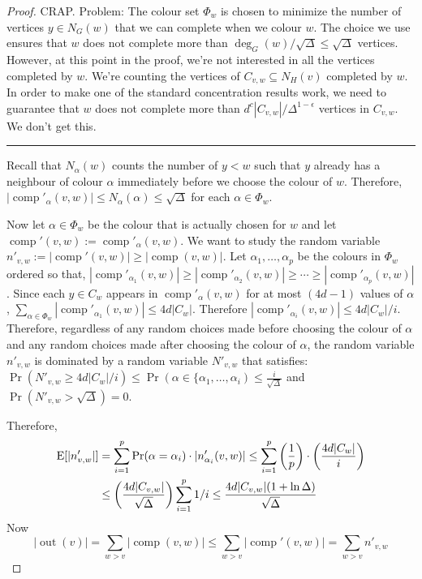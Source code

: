 \documentclass[kpfonts]{patmorin}
\DeclareMathOperator{\outn}{out}
\DeclareMathOperator{\comp}{comp}
\begin{document}
\begin{proof}
  CRAP.  Problem: The colour set $\Phi_w$ is chosen to minimize the number of vertices $y\in N_G(w)$ that we can complete when we colour $w$.   The choice we use ensures that $w$ does not complete more than $\deg_G(w)/\sqrt{\Delta}\le \sqrt{\Delta}$ vertices.  However, at this point in the proof, we're not interested in all the vertices completed by $w$.  We're counting the vertices of $C_{v,w}\subseteq N_H(v)$ completed by $w$.  In order to make one of the standard concentration results work, we need to guarantee that $w$ does not complete more than $d^c|C_{v,w}|/\Delta^{1-\epsilon}$ vertices in $C_{v,w}$.  We don't get this.

  \hrule






  Recall that $N_\alpha(w)$ counts the number of $y < w$ such that $y$ already has a neighbour of colour $\alpha$ immediately before we choose the colour of $w$.  Therefore,  $|\comp'_\alpha(v,w)|\le N_\alpha(\alpha)\le \sqrt{\Delta}$ for each $\alpha\in\Phi_w$.

  Now let $\alpha\in\Phi_w$ be the colour that is actually chosen for $w$ and let $\comp'(v,w):=\comp'_\alpha(v,w)$.  We want to study the random variable $n'_{v,w}:=|\comp'(v,w)|\ge |\comp(v,w)|$.  Let $\alpha_1,\ldots,\alpha_p$ be the colours in $\Phi_w$ ordered so that, $|\comp'_{\alpha_1}(v,w)|\ge|\comp'_{\alpha_2}(v,w)|\ge\cdots\ge |\comp'_{\alpha_p}(v,w)|$.  Since each $y\in C_w$ appears in
  $\comp'_{\alpha}(v,w)$ for at most $(4d-1)$ values of $\alpha$,  $\sum_{\alpha\in\Phi_w} |\comp'_{\alpha_1}(v,w)| \le 4d|C_w|$.  Therefore $|\comp'_{\alpha_i}(v,w)|\le 4d|C_w|/i$.    Therefore, regardless of any random choices made before choosing the colour of $\alpha$ and any random choices made after choosing the colour of $\alpha$, the random variable $n'_{v,w}$ is dominated by a random variable $N'_{v,w}$ that satisfies:
    $\Pr(N'_{v,w} \ge 4d|C_w|/i) \le \Pr(\alpha\in\{\alpha_1,\ldots,\alpha_i)\le \tfrac{i}{\sqrt{\Delta}}$
    and $\Pr(N'_{v,w}>\sqrt{\Delta})=0$.







  Therefore,
  \begin{align*}
    \mathrm{E}[|n'_{v,w}|]
    & = \sum_{i=1}^p \Pr(\alpha=\alpha_i)\cdot |n'_{\alpha_i}(v,w)|
    \le \sum_{i=1}^p \left(\frac{1}{p}\right)\cdot\left(\frac{4d|C_w|}{i}\right) \\
    & \le \left(\frac{4d|C_{v,w}|}{\sqrt{\Delta}}\right) \sum_{i=1}^p 1/i
    \le \frac{4d|C_{v,w}|(1+\ln \Delta)}{\sqrt{\Delta}}
  \end{align*}
  Now
  \[
     |\outn(v)| = \sum_{w>v}|\comp(v,w)|\le \sum_{w>v}|\comp'(v,w)|=\sum_{w>v} n'_{v,w}
  \]




\end{proof}
\end{document}
